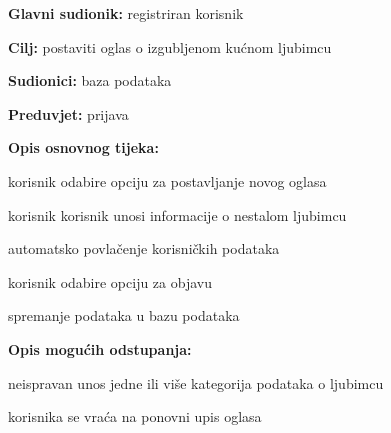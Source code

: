 					\noindent {}
					\begin{packed_item}
						
						\item \textbf{Glavni sudionik: } registriran korisnik
						\item  \textbf{Cilj:} postaviti oglas o izgubljenom kućnom ljubimcu
						\item  \textbf{Sudionici:} baza podataka
						\item  \textbf{Preduvjet:} prijava
						\item  \textbf{Opis osnovnog tijeka:}
						
						\item[] \begin{packed_enum}
							
							\item korisnik odabire opciju za postavljanje novog oglasa
							\item korisnik korisnik unosi informacije o nestalom ljubimcu
							\item automatsko povlačenje korisničkih podataka
							\item korisnik odabire opciju za objavu
							\item spremanje podataka u bazu podataka
						\end{packed_enum}
						
						\item  \textbf{Opis mogućih odstupanja:}
						
						\item[] \begin{packed_item}
							
							\item[4.a] neispravan unos jedne ili više kategorija podataka o ljubimcu
							\item[] \begin{packed_enum}
								\item korisnika se vraća na ponovni upis oglasa
							\end{packed_enum}
							
						\end{packed_item}
					\end{packed_item}
					
